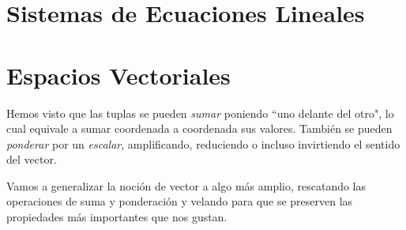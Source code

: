 \documentclass[12pt]{book}
\def\pq{\vspace{0.5cm}}
\begin{document}
\chapter{Sistemas de Ecuaciones Lineales}



\chapter{Espacios Vectoriales}

\pq

Hemos visto que las tuplas se pueden \emph{sumar} poniendo ``uno delante del otro", lo cual equivale a sumar coordenada a coordenada sus valores.
También se pueden \emph{ponderar} por un \emph{escalar}, amplificando, reduciendo o incluso invirtiendo el sentido del vector.

Vamos a generalizar la noción de vector a algo más amplio, rescatando las operaciones de suma y ponderación y velando para que se preserven las propiedades más importantes que nos gustan.
\end{document}
